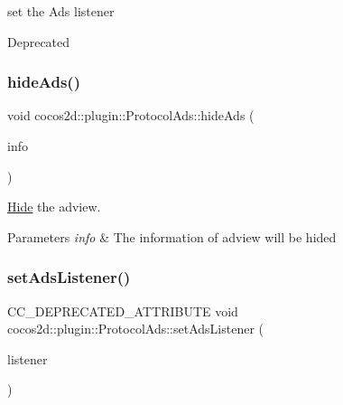 set the Ads listener 

\begin{DoxyRefDesc}{Deprecated}
\item[\hyperlink{deprecated__deprecated000231}{Deprecated}]\end{DoxyRefDesc}
\mbox{\label{classcocos2d_1_1plugin_1_1ProtocolAds_a43a0b1574b54ced4ca21616fad379859}} 
\subsubsection{\texorpdfstring{hide\+Ads()}{hideAds()}}
{\footnotesize\ttfamily void cocos2d\+::plugin\+::\+Protocol\+Ads\+::hide\+Ads (\begin{DoxyParamCaption}\item[{T\+Ads\+Info}]{info }\end{DoxyParamCaption})}



\hyperlink{classHide}{Hide} the adview. 


\begin{DoxyParams}{Parameters}
{\em info} & The information of adview will be hided \\
\hline
\end{DoxyParams}
\mbox{\label{classcocos2d_1_1plugin_1_1ProtocolAds_a2ea6f225787b7f62431d2fd695b753c6}} 
\subsubsection{\texorpdfstring{set\+Ads\+Listener()}{setAdsListener()}}
{\footnotesize\ttfamily C\+C\+\_\+\+D\+E\+P\+R\+E\+C\+A\+T\+E\+D\+\_\+\+A\+T\+T\+R\+I\+B\+U\+TE void cocos2d\+::plugin\+::\+Protocol\+Ads\+::set\+Ads\+Listener (\begin{DoxyParamCaption}\item[{\hyperlink{classcocos2d_1_1plugin_1_1AdsListener}{Ads\+Listener} $\ast$}]{listener }\end{DoxyParamCaption})\hspace{0.3cm}{\ttfamily [inline]}}



